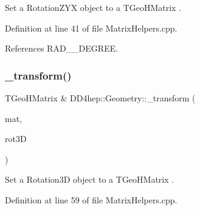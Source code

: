 Set a Rotation\+Z\+YX object to a T\+Geo\+H\+Matrix . 



Definition at line 41 of file Matrix\+Helpers.\+cpp.



References R\+A\+D\+\_\+\_\+\+D\+E\+G\+R\+EE.

\hypertarget{group___d_d4_h_e_p___g_e_o_m_e_t_r_y_ga249607824f27e539ae7a6d93d367afc6}{}\label{group___d_d4_h_e_p___g_e_o_m_e_t_r_y_ga249607824f27e539ae7a6d93d367afc6} 
\subsubsection{\texorpdfstring{\+\_\+transform()}{\_transform()}\hspace{0.1cm}{\footnotesize\ttfamily [9/11]}}
{\footnotesize\ttfamily T\+Geo\+H\+Matrix \& D\+D4hep\+::\+Geometry\+::\+\_\+transform (\begin{DoxyParamCaption}\item[{T\+Geo\+H\+Matrix \&}]{mat,  }\item[{const \hyperlink{namespace_d_d4hep_1_1_geometry_a022fecb763315fa2bf39cbb648944a0e}{Geometry\+::\+Rotation3D} \&}]{rot3D }\end{DoxyParamCaption})}



Set a Rotation3D object to a T\+Geo\+H\+Matrix . 



Definition at line 59 of file Matrix\+Helpers.\+cpp.

\hypertarget{group___d_d4_h_e_p___g_e_o_m_e_t_r_y_ga71170881a8a2e3803a68f7e55d237188}{}\label{group___d_d4_h_e_p___g_e_o_m_e_t_r_y_ga71170881a8a2e3803a68f7e55d237188} 

